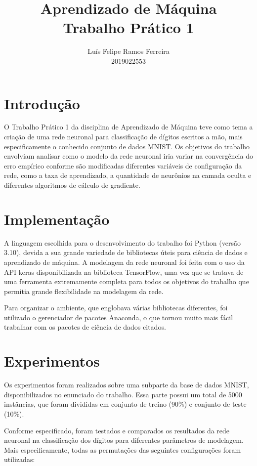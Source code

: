 \documentclass{article}
\title{Aprendizado de Máquina \\ Trabalho Prático 1}
\author{Luís Felipe Ramos Ferreira \\ 2019022553}
\begin{document}
\maketitle

\section{Introdução}

O Trabalho Prático 1 da disciplina de Aprendizado de Máquina teve como tema a criação de uma rede neuronal para classificação de dígitos escritos a mão, mais especificamente o conhecido conjunto de dados MNIST. Os objetivos do trabalho envolviam analisar como o modelo da rede neuronal iria variar na convergência do erro empírico conforme são modificadas diferentes variáveis de configuração da rede, como a taxa de aprendizado, a quantidade de neurônios na camada oculta e diferentes algoritmos de cálculo de gradiente.

\section{Implementação}

A linguagem escolhida para o desenvolvimento do trabalho foi Python (versão 3.10), devida a sua grande variedade de bibliotecas úteis para ciência de dados e aprendizado de máquina. A modelagem da rede neuronal foi feita com o uso da API keras disponibilizada na biblioteca TensorFlow, uma vez que se tratava de uma ferramenta extremamente completa para todos os objetivos do trabalho que permitia grande flexibilidade na modelagem da rede.

Para organizar o ambiente, que englobava várias bibliotecas diferentes, foi utilizado o gerenciador de pacotes Anaconda, o que tornou muito mais fácil trabalhar com os pacotes de ciência de dados citados.

\section{Experimentos}

Os experimentos foram realizados sobre uma subparte da base de dados MNIST, disponibilizados no enunciado do trabalho. Essa parte possui um total de 5000 instâncias, que foram divididas em conjunto de treino (90\%) e conjunto de teste (10\%).

Conforme especificado, foram testados e comparados os resultados da rede neuronal na classificação dos dígitos para diferentes parâmetros de modelagem. Mais especificamente, todas as permutações das seguintes configurações foram utilizadas:
\end{document}
